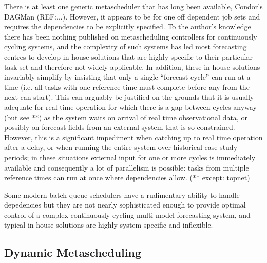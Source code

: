 \documentclass[11pt,a4paper]{article}
\begin{document}
There is at least one generic metascheduler that has long been
available, Condor's DAGMan (REF:...). However, it appears to be for one
off dependent job sets and requires the dependencies to be explicitly
specified.  To the author's knowledge there has been nothing published
on metascheduling controllers for continuously cycling systems, and the
complexity of such systems has led most forecasting centres to develop
in-house solutions that are highly specific to their particular task set
and therefore not widely applicable. In addition, these in-house
solutions invariably simplify by insisting that only a single ``forecast
cycle'' can run at a time (i.e. all tasks with one reference time must
complete before any from the next can start). This can arguably be
justified on the grounds that it is usually adequate for real time
operation for which there is a gap between cycles anyway (but see **) as
the system waits on arrival of real time observational data, or possibly
on forecast fields from an external system that is so constrained.
However, this is a significant impediment when catching up to real time
operation after a delay, or when running the entire system over
historical case study periods; in these situations external input for
one or more cycles is immediately available and consequently a lot of
parallelism is possible: tasks from multiple reference times can run at
once where dependencies allow.  (** except: topnet)

Some modern batch queue schedulers have a rudimentary ability to handle
depedencies but they are not nearly sophisticated enough to provide
optimal control of a complex continuously cycling multi-model
forecasting system, and typical in-house solutions are highly
system-specific and inflexible. 

\subsection{Dynamic Metascheduling}
\end{document}
